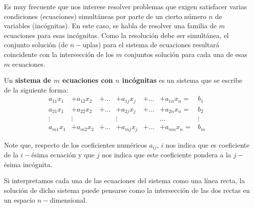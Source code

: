 Es muy frecuente que nos interese resolver problemas que exigen satisfacer varias
condiciones (ecuaciones) simultáneas por parte de un cierto número $n$ de variables
(incógnitas). En este caso, se habla de resolver una familia de $m$ ecuaciones para esas
incógnitas. Como la resolución debe ser simultánea, el conjunto solución (de $n-$uplas) para
el sistema de ecuaciones resultará coincidente con la intersección de los $m$ conjuntos
solución para cada una de esas $m$ ecuaciones.

\begin{defin}
Un \textbf{sistema de $m$ ecuaciones con $n$ incógnitas} es un sistema que se escribe de la siguiente forma:
\[\begin{array}{ccccccc}
        a_{11}x_1&+ a_{12} x_2&+ \dots &+ a_{1j}x_j &+ \dots &+ a_{1n}x_n=& b_1\\
     a_{21}x_1&+ a_{22} x_2&+ \dots &+ a_{2j} x_j&+\dots &+  a_{2n}x_n=& b_2\\
    \vdots & \vdots &  & \vdots  &  &\dots  & \vdots\\
     a_{m1}x_1&+ a_{m2} x_2&+ \dots&+  a_{mj}x_j&+ \dots&+  a_{mn}x_n=& b_m
\end{array}\]
\end{defin}
\begin{rmk}
Note que, respecto de los coeficientes numéricos $a_{ij}$, $i$ nos indica que es coeficiente de la $i-$ésima ecuación y que $j$ nos indica que este coeficiente pondera a la $j-$ésima incógnita.
\end{rmk}




Si interpretamos cada una de las ecuaciones del sistema como una l\'inea recta, la soluci\'on de dicho sistema puede pensarse como la intersecci\'on de las dos rectas en un espacio $n-$dimensional.


